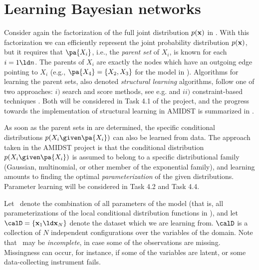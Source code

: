 

\section{Learning Bayesian networks} \label{sec:learningAsInference}


Consider again the factorization of the full joint distribution $p(\bx)$ in . With this factorization we can efficiently represent the joint probability distribution $p(\bx)$, but it requires that $\pa{X_i}$, i.e., the \textit{parent set} of  $X_i$, is known for each $i=1\ld n$. 
The parents of $X_i$ are exactly the nodes which have an outgoing edge pointing to $X_i$ (e.g., $\pa{X_4}=\{X_2,X_3\}$ for the model in ). 
Algorithms for learning the parent sets, also denoted \textit{structural learning} algorithms, follow one of two approaches: $i)$ search and score  methods, see e.g. \cite{CooperHerskovitz92} and $ii)$ constraint-based techniques \cite{SGS}. Both will be considered in Task 4.1 of the project, and the progress towards the implementation of structural learning in AMIDST is summarized in .

As soon as the parent sets in   are determined, the specific conditional distributions $p(X_i\given\pa{X_i})$ can also be learned from data. The approach taken in the AMIDST project is that the conditional distribution $p(X_i\given\pa{X_i})$ is assumed to belong to a specific distributional family  (Gaussian, multinomial, or other member of the exponential family), and learning amounts to finding the optimal \textit{parameterization} of the given distributions. Parameter learning will be considered in Task 4.2 and Task 4.4.



Let \bmtheta\ denote the combination of all parameters of the model (that is, all parameterizations of the local conditional distribution functions in ), and let $\calD=\{\bx_1\ld\bx_N\}$ denote the dataset which we are learning from. $\calD$ is a collection of $N$ independent configurations over the variables of the domain. Note that \calD\ may be \textit{incomplete}, in case some of the observations are missing. Missingness can occur, for instance, if some of the variables are latent, or some data-collecting instrument fails. 

